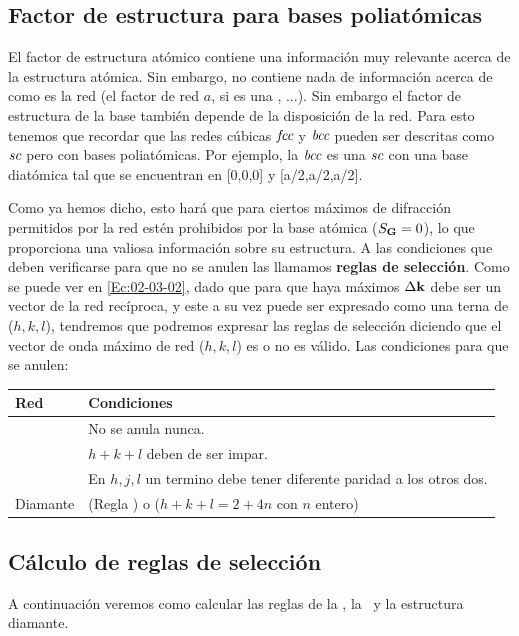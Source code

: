 \subsection{Factor de estructura para bases poliatómicas}

El factor de estructura atómico contiene una información muy relevante acerca de la estructura atómica. Sin embargo, no contiene nada de información acerca de como es la red (el factor de red $a$, si es una \fcc, \bcc...). Sin embargo el factor de estructura de la base también depende de la disposición de la red. Para esto tenemos que recordar que las redes cúbicas $\fcc$ y $\bcc$ pueden ser descritas como $\sc$ pero con bases poliatómicas. Por ejemplo, la $\bcc$ es una $\sc$ con una base diatómica tal que se encuentran en [0,0,0] y [a/2,a/2,a/2].  

Como ya hemos dicho, esto hará que para ciertos máximos de difracción permitidos por la red estén prohibidos por la base atómica ($S_\Gn=0$), lo que proporciona una valiosa información sobre su estructura. A las condiciones que deben verificarse  para que no se anulen las llamamos \textbf{reglas de selección}. Como se puede ver en \ref{Ec:02-03-02}, dado que para que haya máximos $\Delta \kn$ debe ser un vector de la red recíproca, y este a su vez puede ser expresado como una terna de ($h,k,l$), tendremos que podremos expresar las reglas de selección diciendo que el vector de onda máximo de red ($h,k,l$) es o no es válido. Las condiciones para que se anulen:

\begin{table}[h!] \centering
	\begin{tabular}{l|l}
		Red & Condiciones \\ 
		\hline 
		\sc & No se anula nunca. \\
		\bcc & $h+k+l$ deben de ser impar. \\
		\fcc & En $h,j,l$  un termino debe tener diferente paridad a los otros dos. \\
		Diamante & (Regla \fcc)  o ($h+k+l=2+4n$ con $n$ entero) \\
	\end{tabular}
\end{table}

\subsection{Cálculo de reglas de selección}

A continuación veremos como calcular las reglas de la \bcc, la \fcc \ y la estructura diamante.

